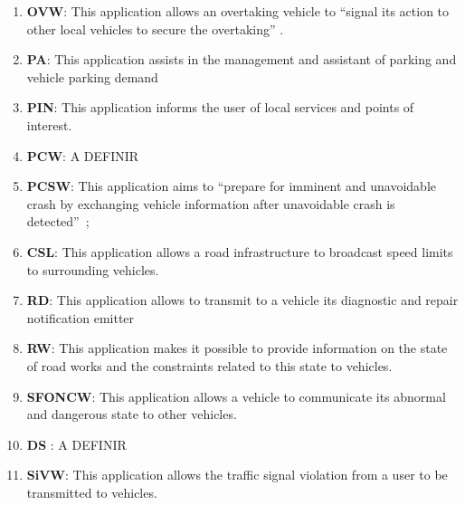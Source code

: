 \begin{enumerate}
\item \textbf{\acrfull{OVW}}: This application allows an overtaking vehicle to ``signal its action to other local vehicles to secure the overtaking'' \cite{etsi_etsi_tr_102_638_intelligent_2009,j_vehicle--vehicle_2014,karagiannis_vehicular_2011,mo_simulation_2018}.
\item \textbf{\acrfull{PA}}: This application assists in the management and assistant of parking and vehicle parking demand \cite{faria_smart_2017,boban_use_2017,ferreira_self-automated_2014,usdt_intelligent_2021}
\item \textbf{\acrfull{PIN}}: This application informs the user of local services and points of interest. \cite{etsi_etsi_tr_102_638_intelligent_2009}
\item \textbf{\acrfull{PCW}}: A DEFINIR \cite{al-sultan_comprehensive_2014}
\item \textbf{\acrfull{PCSW}}: This application aims to ``prepare for imminent and unavoidable crash by exchanging vehicle information after unavoidable crash is detected''~\cite{etsi_etsi_tr_102_638_intelligent_2009,papadimitratos_vehicular_2009,karagiannis_vehicular_2011,chang_intelligent_2010,cailean_survey_2014,xu_dsrc_2017,sewalkar_vehicle--pedestrian_2019,zeadally_tutorial_2020,swanson_crash_2016}; %
\item \textbf{\acrlong{CSL}}: This application allows a road infrastructure to broadcast speed limits to surrounding vehicles. \cite{etsi_etsi_tr_102_638_intelligent_2009,cailean_survey_2014, xu_dsrc_2017,usdt_intelligent_2021}
\item \textbf{\acrfull{RD}}: This application allows to transmit to a vehicle its diagnostic and repair notification emitter \cite{etsi_etsi_tr_102_638_intelligent_2009}
\item \textbf{\acrfull{RW}}: This application makes it possible to provide information on the state of road works and the constraints related to this state to vehicles. \cite{etsi_etsi_tr_102_638_intelligent_2009,brown_review_2019,usdt_intelligent_2021}
\item \textbf{\acrfull{SFONCW}}: This application allows a vehicle to communicate its abnormal and dangerous state to other vehicles. \cite{etsi_etsi_tr_102_638_intelligent_2009}
\item \textbf{\acrfull{DS}} \cite{etsi_etsi_tr_102_638_intelligent_2009}: A DEFINIR
\item \textbf{\acrfull{SiVW}}: This application allows the traffic signal violation from a user to be transmitted to vehicles. \cite{etsi_etsi_tr_102_638_intelligent_2009,papadimitratos_vehicular_2009,al-sultan_comprehensive_2014,cailean_survey_2014,xu_dsrc_2017,usdt_intelligent_2021}

\end{enumerate}
